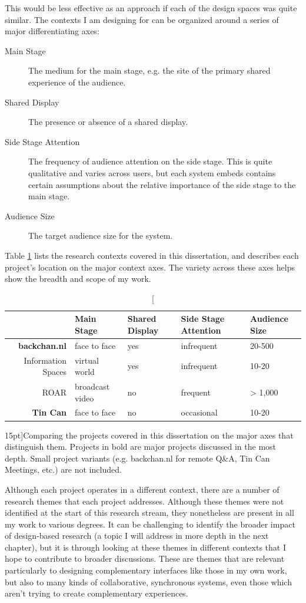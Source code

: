 This would be less effective as an approach if each of the design spaces was quite similar. The contexts I am designing for can be organized around a series of major differentiating axes:

\begin{description}
\item[Main Stage]{The medium for the main stage, e.g. the site of the primary shared experience of the audience.}
\item[Shared Display]{The presence or absence of a shared display.}
\item[Side Stage Attention]{The frequency of audience attention on the side stage. This is quite qualitative and varies across users, but each system embeds contains certain assumptions about the relative importance of the side stage to the main stage.}
\item[Audience Size]{The target audience size for the system.}
\end{description}

Table \ref{tab:project-axes} lists the research contexts covered in this dissertation, and describes each project's location on the major context axes. The variety across these axes helps show the breadth and scope of my work. 
\begin{table}[tb]

\begin{tabular}{r|llll}
& Main Stage & Shared Display & Side Stage Attention & Audience Size \\
\hline
\textbf{backchan.nl} & face to face & yes & infrequent & 20-500 \\
Information Spaces & virtual world & yes & infrequent & 10-20 \\
ROAR & broadcast video & no & frequent & > 1,000 \\
\textbf{Tin Can} & face to face & no & occasional & 10-20 \\
\end{tabular}
\label{tab:project-axes}
\caption[][15pt]{Comparing the projects covered in this dissertation on the major axes that distinguish them. Projects in bold are major projects discussed in the most depth. Small project variants (e.g. backchan.nl for remote Q\&A, Tin Can Meetings, etc.) are not included.}
\end{table}


Although each project operates in a different context, there are a number of research themes that each project addresses. Although these themes were not identified at the start of this research stream, they nonetheless are present in all my work to various degrees. It can be challenging to identify the broader impact of design-based research (a topic I will address in more depth in the next chapter), but it is through looking at these themes in different contexts that I hope to contribute to broader discussions. These are themes that are relevant particularly to designing complementary interfaces like those in my own work, but also to many kinds of collaborative, synchronous systems, even those which aren't trying to create complementary experiences.

